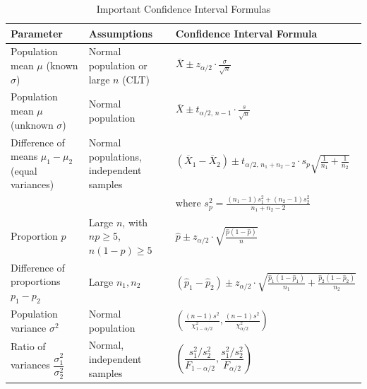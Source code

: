 \documentclass[twoside]{book}
\begin{document}


\begin{table}
	\centering
	\caption{Important Confidence Interval Formulas}
	\begin{tabular}{@{}lll@{}}
		\toprule
		\textbf{Parameter} & \textbf{Assumptions} & \textbf{Confidence Interval Formula} \\ \midrule

		Population mean $\mu$ (known $\sigma$) &
		Normal population or large $n$ (CLT) &
		$\displaystyle \overline{X} \pm z_{\alpha/2} \cdot \frac{\sigma}{\sqrt{n}}$ \\[10pt]

		Population mean $\mu$ (unknown $\sigma$) &
		Normal population &
		$\displaystyle \overline{X} \pm t_{\alpha/2,\,n-1} \cdot \frac{s}{\sqrt{n}}$ \\[10pt]

		Difference of means $\mu_1 - \mu_2$ (equal variances) &
		Normal populations, independent samples &
		$\displaystyle (\overline{X}_1 - \overline{X}_2) \pm t_{\alpha/2,\,n_1+n_2-2} \cdot s_p \sqrt{\frac{1}{n_1} + \frac{1}{n_2}}$ \\
		& & where $\displaystyle s_p^2 = \frac{(n_1-1)s_1^2 + (n_2-1)s_2^2}{n_1 + n_2 - 2}$ \\[10pt]

		Proportion $p$ &
		Large $n$, with $np \ge 5$, $n(1-p) \ge 5$ &
		$\displaystyle \hat{p} \pm z_{\alpha/2} \cdot \sqrt{\frac{\hat{p}(1 - \hat{p})}{n}}$ \\[10pt]

		Difference of proportions $p_1 - p_2$ &
		Large $n_1, n_2$ &
		$\displaystyle (\hat{p}_1 - \hat{p}_2) \pm z_{\alpha/2} \cdot \sqrt{ \frac{\hat{p}_1(1 - \hat{p}_1)}{n_1} + \frac{\hat{p}_2(1 - \hat{p}_2)}{n_2} }$ \\[10pt]

		Population variance $\sigma^2$ &
		Normal population &
		$\displaystyle \left( \frac{(n-1)s^2}{\chi^2_{1-\alpha/2}}, \frac{(n-1)s^2}{\chi^2_{\alpha/2}} \right)$ \\[10pt]

		Ratio of variances $\dfrac{\sigma_1^2}{\sigma_2^2}$ &
		Normal, independent samples &
		$\displaystyle \left( \dfrac{s_1^2 / s_2^2}{F_{1-\alpha/2}}, \dfrac{s_1^2 / s_2^2}{F_{\alpha/2}} \right)$ \\

		\bottomrule
	\end{tabular}
	\label{tab:ci_sideways}
\end{table}
\end{document}
